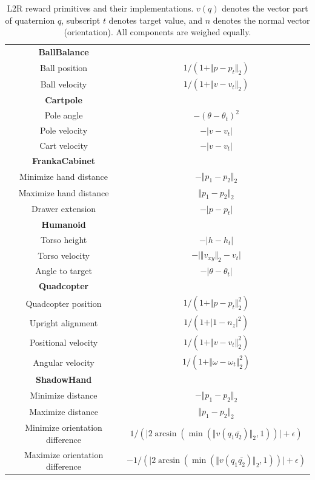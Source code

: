 \begin{table}[h]
\begin{center}
\begin{tabular}{cc}
                \textbf{BallBalance} & \\
                Ball position & $1 / (1 + \Vert p - p_t \Vert_2)$ \\
                Ball velocity & $1 / (1 + \Vert v - v_t \Vert_2)$ \\
                \hline
                \textbf{Cartpole} & \\
                Pole angle & $-(\theta - \theta_t)^2$ \\
                Pole velocity & $-\vert v - v_t \vert$ \\
                Cart velocity & $-\vert v - v_t \vert$ \\
                \hline
                \textbf{FrankaCabinet} & \\
                Minimize hand distance & $-\Vert p_1 - p_2 \Vert_2$ \\
                Maximize hand distance & $\Vert p_1 - p_2 \Vert_2$ \\
                Drawer extension & $-\vert p - p_t \vert$ \\
                \hline
                \textbf{Humanoid} & \\
                Torso height & $-\vert h - h_t \vert$ \\
                Torso velocity & $-\vert \Vert v_{xy} \Vert_2 - v_t \vert$ \\
                Angle to target & $-\vert \theta - \theta_t \vert$ \\
                \hline
                \textbf{Quadcopter} & \\
                Quadcopter position & $1 / (1 + \Vert p - p_t \Vert_2^2)$ \\
                Upright alignment & $1 / (1 + \vert 1 - n_z \vert^2)$ \\
                Positional velocity & $1 / (1 + \Vert v - v_t \Vert_2^2)$ \\
                Angular velocity & $1 / (1 + \Vert \omega - \omega_t \Vert_2^2)$ \\
                \hline
                \textbf{ShadowHand} & \\
                Minimize distance & $-\Vert p_1 - p_2 \Vert_2$ \\
                Maximize distance & $\Vert p_1 - p_2 \Vert_2$ \\
                Minimize orientation difference & $1/(\vert2\arcsin(\min(\Vert v(q_1\bar{q_2}) \Vert_2, 1))\vert+\epsilon)$ \\
                Maximize orientation difference & $-1/(\vert2\arcsin(\min(\Vert v(q_1\bar{q_2}) \Vert_2, 1))\vert+\epsilon)$ \\
			\bottomrule
		\end{tabular}
	\end{center}
	\caption{L2R reward primitives and their implementations. $v(q)$ denotes the vector part of quaternion $q$, subscript $t$ denotes target value, and $n$ denotes the normal vector (orientation). All components are weighed equally.}
    \label{table:l2r_form}
\end{table}

